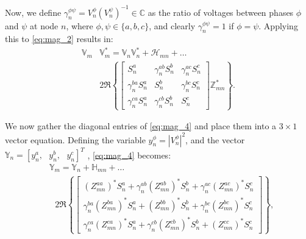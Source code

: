 Now, we define $\gamma_{n}^{\phi \psi} = V_{n}^{\phi} {\left( V_{n}^{\psi} \right)}^{-1} \in \mathbb{C}$ as the ratio of voltages between phases $\phi$ and $\psi$ at node $n$, where $\phi,\psi \in \{ a,b,c \}$, and clearly $\gamma_{n}^{\phi \psi} = 1 $ if $\phi = \psi$. Applying this to \eqref{eq:mag_2} results in:
\begin{equation}
	\begin{aligned}
		\mathbb{V}_{m} & \mathbb{V}_{m}^{*} = \mathbb{V}_{n} \mathbb{V}_{n}^{*} + \mathcal H_{mn} + \ldots \\
    	& 2 \Re \left\{
    	\begin{bmatrix}
    		S_{n}^{a} & \gamma_{n}^{ab} S_{n}^{b} & \gamma_{n}^{ac} S_{n}^{c} \\
    		\gamma_{n}^{ba} S_{n}^{a} & S_{n}^{b} & \gamma_{n}^{bc} S_{n}^{c} \\
    		\gamma_{n}^{ca} S_{n}^{a} & \gamma_{n}^{cb} S_{n}^{b} & S_{n}^{c}
    	\end{bmatrix}
    	\mathbb{Z}_{mn}^* \right\} .
    \end{aligned}
    \label{eq:mag_4}
\end{equation}

We now gather the diagonal entries of \eqref{eq:mag_4} and place them into a $3 \times 1$ vector equation.  Defining the variable $y_{n}^{\phi} = | V_{n}^{\phi} |^{2}$, and the vector
$\mathbb{Y}_{n} = {\left[ y_{n}^{a}, \text{ } y_{n}^{b}, \text{ } y_{n}^{c} \right]}^{T}$
, \eqref{eq:mag_4} becomes:
\begin{align}
	& \mathbb{Y}_{m} = \mathbb{Y}_{n} + \mathbb{H}_{mn} + \ldots \nonumber \\
    & \text{ } 2 \Re \left\{
    \begin{bmatrix}
    	{\left( Z_{mn}^{aa} \right)}^{*} S_{n}^{a}  + \gamma_{n}^{ab} {\left( Z_{mn}^{ab} \right)}^{*} S_{n}^{b}  + \gamma_{n}^{ac} {\left( Z_{mn}^{ac} \right)}^{*} S_{n}^{c} \\
    	\gamma_{n}^{ba} {\left( Z_{mn}^{ba} \right)}^{*} S_{n}^{a} + {\left( Z_{mn}^{bb} \right)}^{*} S_{n}^{b} + \gamma_{n}^{bc} {\left( Z_{mn}^{bc} \right)}^{*} S_{n}^{c} \\
    	\gamma_{n}^{ca} {\left( Z_{mn}^{ca} \right)}^{*} S_{n}^{a} + \gamma_{n}^{cb} {\left( Z_{mn}^{cb} \right)}^{*} S_{n}^{b} + {\left( Z_{mn}^{cc} \right)}^{*} S_{n}^{c}
    \end{bmatrix}
	\right\}
    \label{eq:mag_5},
\end{align}

